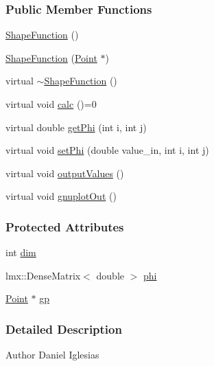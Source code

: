 \subsubsection*{Public Member Functions}
\begin{DoxyCompactItemize}
\item 
\hyperlink{classmknix_1_1_shape_function_a4a35da60e8eb2645a217cce36e6e323a}{Shape\-Function} ()
\item 
\hyperlink{classmknix_1_1_shape_function_adaf264f0f7ae964f9c9dc513e3fe7195}{Shape\-Function} (\hyperlink{classmknix_1_1_point}{Point} $\ast$)
\item 
virtual \hyperlink{classmknix_1_1_shape_function_ac5762f37f460aa48b8d2a53a1f422220}{$\sim$\-Shape\-Function} ()
\item 
virtual void \hyperlink{classmknix_1_1_shape_function_ac4a0d1b43ff7d4adf788e677912a87f7}{calc} ()=0
\item 
virtual double \hyperlink{classmknix_1_1_shape_function_a13f35e2b1cfc89c26ee03ede4bfff586}{get\-Phi} (int i, int j)
\item 
virtual void \hyperlink{classmknix_1_1_shape_function_a45248275e5e6fcaed37195155009e72e}{set\-Phi} (double value\-\_\-in, int i, int j)
\item 
virtual void \hyperlink{classmknix_1_1_shape_function_a50beef3ce4e90c4f884df14f727296f6}{output\-Values} ()
\item 
virtual void \hyperlink{classmknix_1_1_shape_function_a6b287c3758e7d16be4c7c8e86bbb7077}{gnuplot\-Out} ()
\end{DoxyCompactItemize}
\subsubsection*{Protected Attributes}
\begin{DoxyCompactItemize}
\item 
int \hyperlink{classmknix_1_1_shape_function_a1ca9a4d7bc5f82c887ac7e9bdd54aa1e}{dim}
\item 
lmx\-::\-Dense\-Matrix$<$ double $>$ \hyperlink{classmknix_1_1_shape_function_ac1eaf8c2e5d8d6abf4726eb416de13d9}{phi}
\item 
\hyperlink{classmknix_1_1_point}{Point} $\ast$ \hyperlink{classmknix_1_1_shape_function_a70f36189e78b80d045076234e4c668da}{gp}
\end{DoxyCompactItemize}


\subsubsection{Detailed Description}
\begin{DoxyAuthor}{Author}
Daniel Iglesias 
\end{DoxyAuthor}


